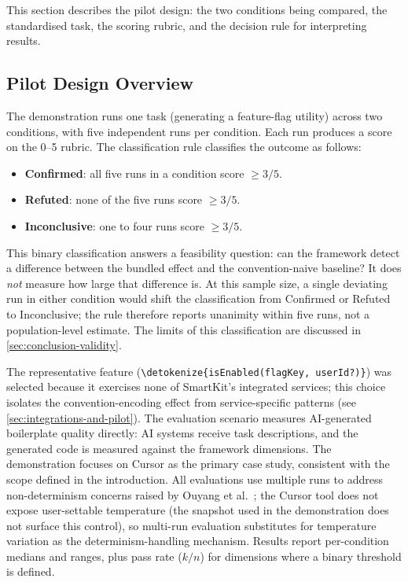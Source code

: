 \documentclass[12pt,a4paper]{report}
\newcommand{\code}[1]{\texttt{\nolinkurl{\detokenize{#1}}}}
\begin{document}
This section describes the pilot design: the two conditions being compared, the standardised task, the scoring rubric, and the decision rule for interpreting results.

\subsection{Pilot Design Overview}
\label{sec:pilot-overview}

The demonstration runs one task (generating a feature-flag utility) across two conditions, with five independent runs per condition. Each run produces a score on the 0--5 rubric. The classification rule classifies the outcome as follows:

\begin{itemize}
    \item \textbf{Confirmed}: all five runs in a condition score $\geq 3/5$.
    \item \textbf{Refuted}: none of the five runs score $\geq 3/5$.
    \item \textbf{Inconclusive}: one to four runs score $\geq 3/5$.
\end{itemize}

This binary classification answers a feasibility question: can the framework detect a difference between the bundled effect and the convention-naive baseline? It does \emph{not} measure how large that difference is. At this sample size, a single deviating run in either condition would shift the classification from Confirmed or Refuted to Inconclusive; the rule therefore reports unanimity within five runs, not a population-level estimate. The limits of this classification are discussed in \autoref{sec:conclusion-validity}.

The representative feature (\code{isEnabled(flagKey, userId?)}) was selected because it exercises none of SmartKit's integrated services; this choice isolates the convention-encoding effect from service-specific patterns (see \autoref{sec:integrations-and-pilot}). The evaluation scenario measures AI-generated boilerplate quality directly: AI systems receive task descriptions, and the generated code is measured against the framework dimensions. The demonstration focuses on Cursor as the primary case study, consistent with the scope defined in the introduction. All evaluations use multiple runs to address non-determinism concerns raised by Ouyang et al.\ \parencite{ouyang2025nondeterminism}; the Cursor tool does not expose user-settable temperature (the snapshot used in the demonstration does not surface this control), so multi-run evaluation substitutes for temperature variation as the determinism-handling mechanism. Results report per-condition medians and ranges, plus pass rate ($k/n$) for dimensions where a binary threshold is defined.
\end{document}
